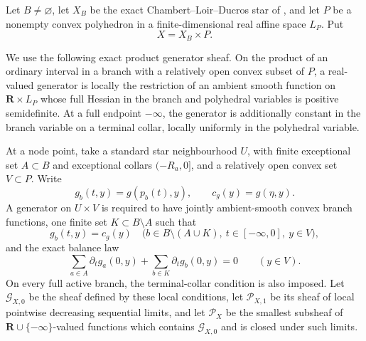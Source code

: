 
\begin{theorem}
\label{thm:p071-infinite-star-polyhedral-collapse}
Let \(B\ne\varnothing\), let \(X_B\) be the exact
Chambert--Loir--Ducros star of
, and let \(P\) be a
nonempty convex polyhedron in a finite-dimensional real affine space
\(L_P\).  Put
\[
                              X=X_B\times P.
\]

We use the following exact product generator sheaf.  On the product of an
ordinary interval in a branch with a relatively open convex subset of
\(P\), a real-valued generator is locally the restriction of an ambient
smooth function on \(\mathbf R\times L_P\) whose full Hessian in the branch
and polyhedral variables is positive semidefinite.  At a full endpoint
\(-\infty\), the generator is additionally constant in the branch variable
on a terminal collar, locally uniformly in the polyhedral variable.

At a node point, take a standard star neighbourhood \(U\), with finite
exceptional set \(A\subset B\) and exceptional collars
\((-R_a,0]\), and a relatively open convex set \(V\subset P\).  Write
\[
 g_b(t,y)=g(p_b(t),y),\qquad c_g(y)=g(\eta,y).
\]
A generator on \(U\times V\) is required to have jointly ambient-smooth
convex branch functions, one finite set \(K\subset B\setminus A\) such that
\begin{equation}
 g_b(t,y)=c_g(y)
 \quad
 \bigl(b\in B\setminus(A\cup K),\
       t\in[-\infty,0],\ y\in V\bigr),
 \label{eq:p071-infinite-polyhedral-smooth-finite-activity}
\end{equation}
and the exact balance law
\begin{equation}
 \sum_{a\in A}\partial_tg_a(0,y)
   +\sum_{b\in K}\partial_tg_b(0,y)=0
 \qquad(y\in V).
 \label{eq:p071-infinite-polyhedral-smooth-balance}
\end{equation}
On every full active branch, the terminal-collar condition is also imposed.
Let \(\mathcal G_{X,0}\) be the sheaf defined by these local conditions,
let \(\mathcal P_{X,1}\) be its sheaf of local pointwise decreasing
sequential limits, and let \(\mathcal P_X\) be the smallest subsheaf of
\(\mathbf R\cup\{-\infty\}\)-valued functions which contains
\(\mathcal G_{X,0}\) and is closed under such limits.


\end{theorem}
